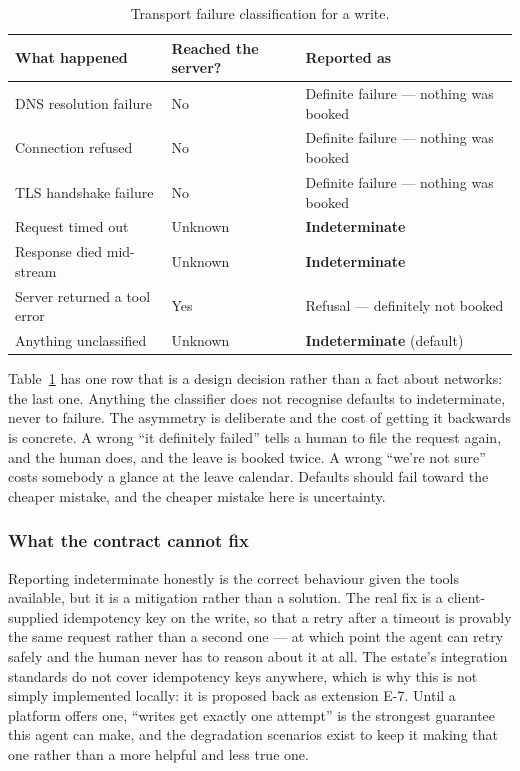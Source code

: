 \documentclass[11pt,a4paper]{article}
\begin{document}
\begin{table}[htbp]
\centering
\caption{Transport failure classification for a write.}
\label{tab:transport}
\begin{tabularx}{\linewidth}{X l X}
\toprule
\textbf{What happened} & \textbf{Reached the server?} & \textbf{Reported as} \\
\midrule
DNS resolution failure & No & Definite failure --- nothing was booked \\
Connection refused & No & Definite failure --- nothing was booked \\
TLS handshake failure & No & Definite failure --- nothing was booked \\
Request timed out & Unknown & \textcolor{accentorange}{\textbf{Indeterminate}} \\
Response died mid-stream & Unknown & \textcolor{accentorange}{\textbf{Indeterminate}} \\
Server returned a tool error & Yes & Refusal --- definitely not booked \\
Anything unclassified & Unknown & \textcolor{accentorange}{\textbf{Indeterminate}} (default) \\
\bottomrule
\end{tabularx}
\end{table}

Table~\ref{tab:transport} has one row that is a design decision rather than a fact about networks: the last one. Anything the classifier does not recognise defaults to indeterminate, never to failure. The asymmetry is deliberate and the cost of getting it backwards is concrete. A wrong ``it definitely failed'' tells a human to file the request again, and the human does, and the leave is booked twice. A wrong ``we're not sure'' costs somebody a glance at the leave calendar. Defaults should fail toward the cheaper mistake, and the cheaper mistake here is uncertainty.

\subsubsection*{What the contract cannot fix}

Reporting indeterminate honestly is the correct behaviour given the tools available, but it is a mitigation rather than a solution. The real fix is a client-supplied idempotency key on the write, so that a retry after a timeout is provably the same request rather than a second one --- at which point the agent can retry safely and the human never has to reason about it at all. The estate's integration standards do not cover idempotency keys anywhere, which is why this is not simply implemented locally: it is proposed back as extension E-7. Until a platform offers one, ``writes get exactly one attempt'' is the strongest guarantee this agent can make, and the degradation scenarios exist to keep it making that one rather than a more helpful and less true one.
\end{document}
